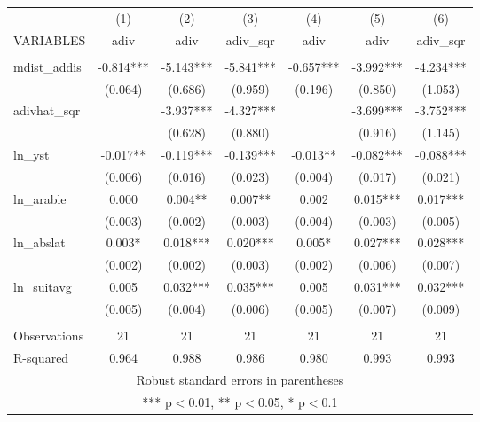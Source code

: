 \documentclass[]{article}
\begin{document}
\begin{tabular}{lcccccc} \hline
 & (1) & (2) & (3) & (4) & (5) & (6) \\
VARIABLES & adiv & adiv & adiv\_sqr & adiv & adiv & adiv\_sqr \\ \hline
 &  &  &  &  &  &  \\
mdist\_addis & -0.814*** & -5.143*** & -5.841*** & -0.657*** & -3.992*** & -4.234*** \\
 & (0.064) & (0.686) & (0.959) & (0.196) & (0.850) & (1.053) \\
adivhat\_sqr &  & -3.937*** & -4.327*** &  & -3.699*** & -3.752*** \\
 &  & (0.628) & (0.880) &  & (0.916) & (1.145) \\
ln\_yst & -0.017** & -0.119*** & -0.139*** & -0.013** & -0.082*** & -0.088*** \\
 & (0.006) & (0.016) & (0.023) & (0.004) & (0.017) & (0.021) \\
ln\_arable & 0.000 & 0.004** & 0.007** & 0.002 & 0.015*** & 0.017*** \\
 & (0.003) & (0.002) & (0.003) & (0.004) & (0.003) & (0.005) \\
ln\_abslat & 0.003* & 0.018*** & 0.020*** & 0.005* & 0.027*** & 0.028*** \\
 & (0.002) & (0.002) & (0.003) & (0.002) & (0.006) & (0.007) \\
ln\_suitavg & 0.005 & 0.032*** & 0.035*** & 0.005 & 0.031*** & 0.032*** \\
 & (0.005) & (0.004) & (0.006) & (0.005) & (0.007) & (0.009) \\
 &  &  &  &  &  &  \\
Observations & 21 & 21 & 21 & 21 & 21 & 21 \\
 R-squared & 0.964 & 0.988 & 0.986 & 0.980 & 0.993 & 0.993 \\ \hline
\multicolumn{7}{c}{ Robust standard errors in parentheses} \\
\multicolumn{7}{c}{ *** p$<$0.01, ** p$<$0.05, * p$<$0.1} \\
\end{tabular}
\end{document}
